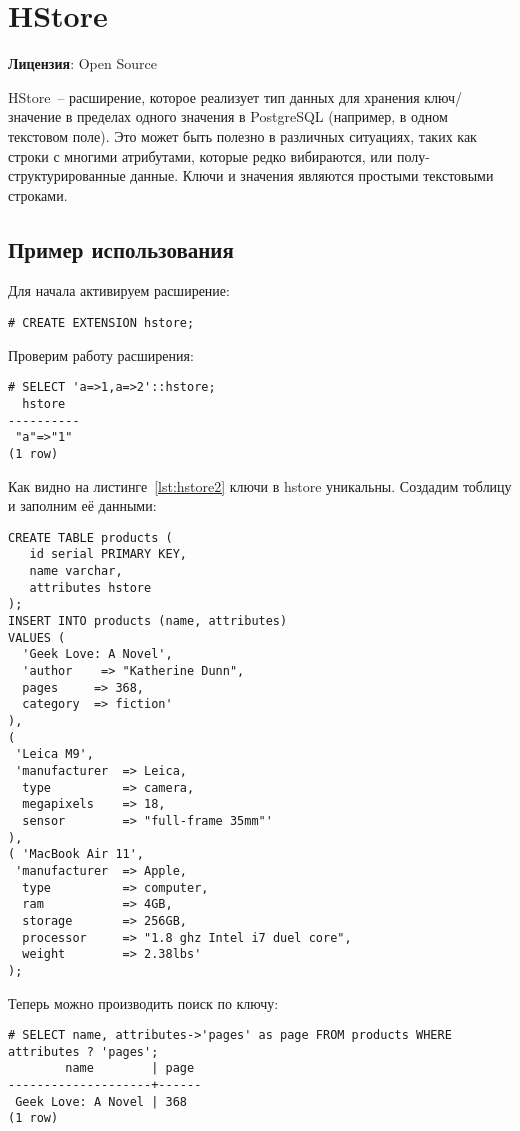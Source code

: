 \section{HStore}
\textbf{Лицензия}: Open Source

HStore~-- расширение, которое реализует тип данных для хранения ключ/значение в пределах одного значения в PostgreSQL (например, в одном текстовом поле). Это может быть полезно в различных ситуациях, таких как строки с многими атрибутами, которые редко вибираются, или полу-структурированные данные. Ключи и значения являются простыми текстовыми строками.

\subsection{Пример использования}
Для начала активируем расширение:
\begin{lstlisting}[label=lst:hstore1,caption=Активация hstore]
# CREATE EXTENSION hstore;
\end{lstlisting}

Проверим работу расширения:
\begin{lstlisting}[label=lst:hstore2,caption=Проверка hstore]
# SELECT 'a=>1,a=>2'::hstore;
  hstore  
----------
 "a"=>"1"
(1 row)
\end{lstlisting}

Как видно на листинге~\ref{lst:hstore2} ключи в hstore уникальны. Создадим тоблицу и заполним её данными:

\begin{lstlisting}[label=lst:hstore3,caption=Проверка hstore]
CREATE TABLE products (
   id serial PRIMARY KEY,
   name varchar,
   attributes hstore
);   
INSERT INTO products (name, attributes)
VALUES (
  'Geek Love: A Novel',
  'author    => "Katherine Dunn",
  pages     => 368,
  category  => fiction'
),
(
 'Leica M9',
 'manufacturer  => Leica,
  type          => camera,
  megapixels    => 18,
  sensor        => "full-frame 35mm"'
),
( 'MacBook Air 11',
 'manufacturer  => Apple,
  type          => computer,
  ram           => 4GB,
  storage       => 256GB,
  processor     => "1.8 ghz Intel i7 duel core",
  weight        => 2.38lbs'
);
\end{lstlisting}

Теперь можно производить поиск по ключу:
\begin{lstlisting}[label=lst:hstore4,caption=Поиск по ключу]
# SELECT name, attributes->'pages' as page FROM products WHERE attributes ? 'pages';
        name        | page 
--------------------+------
 Geek Love: A Novel | 368
(1 row)
\end{lstlisting}

